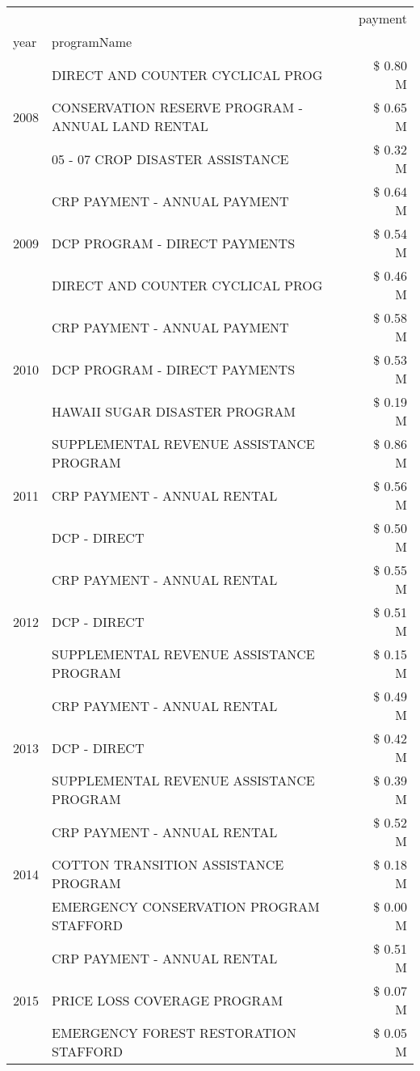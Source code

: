\begin{tabular}{llr}
\toprule
 &  & payment \\
year & programName &  \\
\midrule
\multirow[t]{3}{*}{2008} & DIRECT AND COUNTER CYCLICAL PROG & \$ 0.80 M \\
 & CONSERVATION RESERVE PROGRAM - ANNUAL LAND RENTAL & \$ 0.65 M \\
 & 05 - 07 CROP DISASTER ASSISTANCE & \$ 0.32 M \\
\cline{1-3}
\multirow[t]{3}{*}{2009} & CRP PAYMENT - ANNUAL PAYMENT & \$ 0.64 M \\
 & DCP PROGRAM - DIRECT PAYMENTS & \$ 0.54 M \\
 & DIRECT AND COUNTER CYCLICAL PROG & \$ 0.46 M \\
\cline{1-3}
\multirow[t]{3}{*}{2010} & CRP PAYMENT - ANNUAL PAYMENT & \$ 0.58 M \\
 & DCP PROGRAM - DIRECT PAYMENTS & \$ 0.53 M \\
 & HAWAII SUGAR DISASTER PROGRAM & \$ 0.19 M \\
\cline{1-3}
\multirow[t]{3}{*}{2011} & SUPPLEMENTAL REVENUE ASSISTANCE PROGRAM & \$ 0.86 M \\
 & CRP PAYMENT - ANNUAL RENTAL & \$ 0.56 M \\
 & DCP - DIRECT & \$ 0.50 M \\
\cline{1-3}
\multirow[t]{3}{*}{2012} & CRP PAYMENT - ANNUAL RENTAL & \$ 0.55 M \\
 & DCP - DIRECT & \$ 0.51 M \\
 & SUPPLEMENTAL REVENUE ASSISTANCE PROGRAM & \$ 0.15 M \\
\cline{1-3}
\multirow[t]{3}{*}{2013} & CRP PAYMENT - ANNUAL RENTAL & \$ 0.49 M \\
 & DCP - DIRECT & \$ 0.42 M \\
 & SUPPLEMENTAL REVENUE ASSISTANCE PROGRAM & \$ 0.39 M \\
\cline{1-3}
\multirow[t]{3}{*}{2014} & CRP PAYMENT - ANNUAL RENTAL & \$ 0.52 M \\
 & COTTON TRANSITION ASSISTANCE PROGRAM & \$ 0.18 M \\
 & EMERGENCY CONSERVATION PROGRAM STAFFORD & \$ 0.00 M \\
\cline{1-3}
\multirow[t]{3}{*}{2015} & CRP PAYMENT - ANNUAL RENTAL & \$ 0.51 M \\
 & PRICE LOSS COVERAGE PROGRAM & \$ 0.07 M \\
 & EMERGENCY FOREST RESTORATION STAFFORD & \$ 0.05 M \\

\end{tabular}
